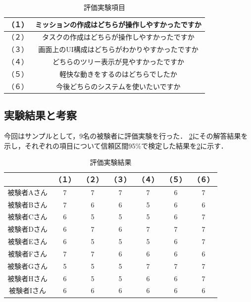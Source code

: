 \begin{table}[t]
 \caption{評価実験項目}
 \begin{center}
	 \begin{tabular}{ | c | c | } \hline
		（１） & ミッションの作成はどちらが操作しやすかったですか \\ \hline
 		（２） & タスクの作成はどちらが操作しやすかったですか \\ \hline
 		（３） & 画面上のUI構成はどちらがわかりやすかったですか \\ \hline
 		（４） & どちらのツリー表示が見やすかったですか \\ \hline
 		（５） & 軽快な動きをするのはどちらでしたか \\ \hline
 		（６） & 今後どちらのシステムを使いたいですか \\ \hline
	 \end{tabular}
	 \label{table:experiment_question}
 \end{center}
\end{table}

\subsection{実験結果と考察}
今回はサンプルとして，9名の被験者に評価実験を行った．
\ref{table:experiment_result}にその解答結果を示し，それぞれの項目について信頼区間95\%で検定した結果を\ref{table:experiment_result}に示す．

\begin{table}[t]
 \caption{評価実験結果}
 \begin{center}
	 \begin{tabular}{ | c || c | c | c | c | c | c | } \hline
		  & （１） & （２） & （３） & （４） & （５） & （６） \\ \hline \hline
			被験者Aさん & 7 & 7 & 7 & 7 & 6 & 7 \\ \hline
			被験者Bさん & 7 & 6 & 6 & 5 & 6 & 6 \\ \hline
			被験者Cさん & 6 & 5 & 5 & 5 & 6 & 7 \\ \hline
			被験者Dさん & 6 & 7 & 6 & 7 & 7 & 7 \\ \hline
			被験者Eさん & 6 & 5 & 5 & 5 & 6 & 7 \\ \hline
			被験者Fさん & 7 & 7 & 6 & 6 & 6 & 6 \\ \hline
			被験者Gさん & 5 & 5 & 5 & 7 & 7 & 7 \\ \hline
			被験者Hさん & 6 & 5 & 5 & 6 & 6 & 7 \\ \hline
			被験者Iさん & 6 & 6 & 6 & 6 & 6 & 6 \\ \hline
	 \end{tabular}
	 \label{table:experiment_result}
 \end{center}
\end{table}

